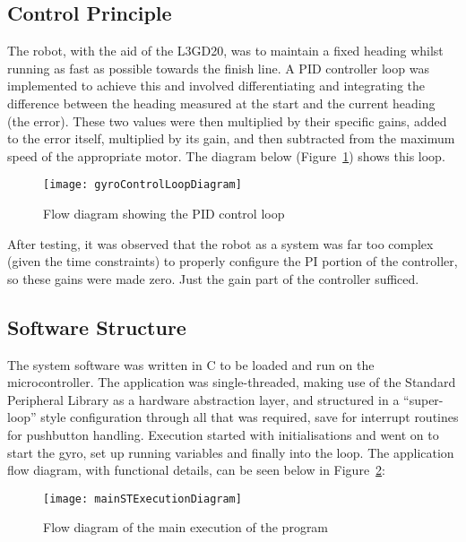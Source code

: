   \subsection{Control Principle}
  \label{sub:Control Principle}
    The robot, with the aid of the L3GD20, was to maintain a fixed heading whilst running as fast as possible towards the finish line. A PID controller loop was implemented to achieve this and involved differentiating and integrating the difference between the heading measured at the start and the current heading (the error). These two values were then multiplied by their specific gains, added to the error itself, multiplied by its gain, and then subtracted from the maximum speed of the appropriate motor. The diagram below (Figure~\ref{fig:gyroControlLoopDiagram}) shows this loop.

    \begin{figure}[H]
      \begin{center}
        \texttt{[image: gyroControlLoopDiagram]}
        \caption{Flow diagram showing the PID control loop}
        \label{fig:gyroControlLoopDiagram}
      \end{center}
    \end{figure}

    After testing, it was observed that the robot as a system was far too complex (given the time constraints) to properly configure the PI portion of the controller, so these gains were made zero. Just the gain part of the controller sufficed.

  \subsection{Software Structure}
  \label{sub:Software Structure}
    The system software was written in C to be loaded and run on the microcontroller. The application was single-threaded, making use of the Standard Peripheral Library as a hardware abstraction layer, and structured in a ``super-loop'' style configuration through all that was required, save for interrupt routines for pushbutton handling. Execution started with initialisations and went on to start the gyro, set up running variables and finally into the loop. The application flow diagram, with functional details, can be seen below in Figure~\ref{fig:mainSTExecutionDiagram}:

    \begin{figure}[H]
      \begin{center}
        \texttt{[image: mainSTExecutionDiagram]}
        \caption{Flow diagram of the main execution of the program}
        \label{fig:mainSTExecutionDiagram}
      \end{center}
    \end{figure}


